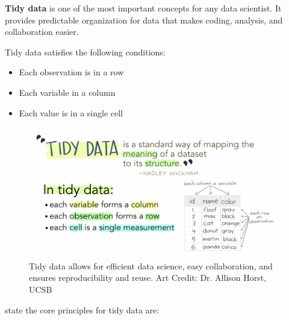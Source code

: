 \documentclass[
]{book}
\providecommand{\tightlist}{%
  \setlength{\itemsep}{0pt}\setlength{\parskip}{0pt}}
\begin{document}
\textbf{Tidy data} is one of the most important concepts for any data scientist. It provides predictable organization for data that makes coding, analysis, and collaboration easier.

Tidy data satisfies the following conditions:

\begin{itemize}
\tightlist
\item
  Each observation is in a row
\item
  Each variable in a column
\item
  Each value is in a single cell
\end{itemize}

\begin{figure}

{\centering \includegraphics[width=0.9\linewidth]{images/tidydata_horst} 

}

\caption{Tidy data allows for efficient data science, easy collaboration, and ensures reproducibility and reuse. Art Credit: Dr. Allison Horst, UCSB}\label{fig:tidydata}
\end{figure}

\citet{Broman_2018} state the core principles for tidy data are:
\end{document}
